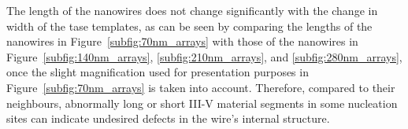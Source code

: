 The length of the nanowires does not change significantly with the change in width of the \acs{tase} templates, as can be seen by comparing the lengths of the nanowires in Figure~\ref{subfig:70nm_arrays} with those of the nanowires in Figure~\ref{subfig:140nm_arrays}, \ref{subfig:210nm_arrays}, and \ref{subfig:280nm_arrays}, once the slight magnification used for presentation purposes in Figure~\ref{subfig:70nm_arrays} is taken into account. Therefore, compared to their neighbours, abnormally long or short III-V material segments in some nucleation sites can indicate undesired defects in the wire's internal structure.

\begin{figure}
    \centering
\end{figure}
